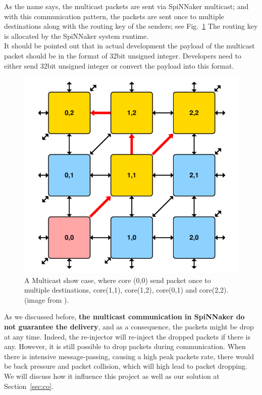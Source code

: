 As the name says, the multicast packets are sent via SpiNNaker multicast; and with this communication pattern, the packets are sent once to multiple destinations along with the routing key of the senders; see Fig.~\ref{fig:multicast} The routing key is allocated by the SpiNNaker system runtime. \\

It should be pointed out that in actual development the payload of the multicast packet should be in the format of 32bit unsigned integer. Developers need to either send 32bit unsigned integer or convert the payload into this format.\\

\begin{figure}[tb]
\centering
\includegraphics[width = 0.7\hsize]{figures/multicast.png}
\caption{A Multicast show case, where core (0,0) send packet once to multiple destinations, core(1,1), core(1,2), core(0,1) and core(2,2).(image from \cite{ws6}).}
\label{fig:multicast}
\end{figure}

As we discussed before, \textbf{the multicast communication in SpiNNaker do not guarantee the delivery}, and as a consequence, the packets might be drop at any time. Indeed, the re-injector will re-inject the dropped packets if there is any. However, it is still possible to drop packets during communication. When there is intensive message-passing, causing a high peak packets rate, there would be back pressure and packet collision, which will high lead to packet dropping. We will discuss how it influence this project as well as our solution at Section~\ref{sec:co}.\\


